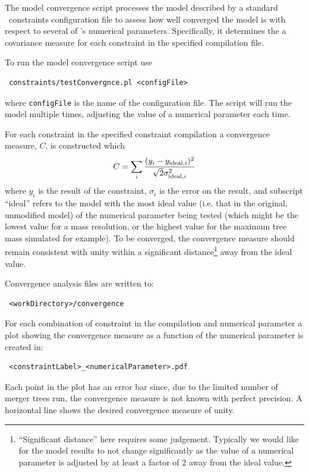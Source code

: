 The model convergence script processes the model described by a standard \glc\ constraints configuration file to assess how well converged the model is with respect to several of \glc's numerical parameters. Specifically, it determines the a covariance measure for each constraint in the specified compilation file.

To run the model convergence script use
\begin{verbatim}
 constraints/testConvergnce.pl <configFile>
\end{verbatim}
where {\tt configFile} is the name of the configuration file. The script will run the model multiple times, adjusting the value of a numerical parameter each time.

For each constraint in the specified constraint compilation a convergence measure, $C$, is constructed which
\begin{equation}
 C = \sum_i {(y_i - y_{{\rm ideal}, i})^2 \over \sqrt{2} \sigma_{{\rm ideal}, i}^2}
\end{equation}
where $y_i$ is the result of the constraint, $\sigma_i$ is the error on the result, and subscript ``ideal'' refers to the model with the most ideal value (i.e. that in the original, unmodified model) of the numerical parameter being tested (which might be the lowest value for a mass resolution, or the highest value for the maximum tree mass simulated for example). To be converged, the convergence measure should remain consistent with unity within a significant distance\footnote{``Significant distance'' here requires some judgement. Typically we would like for the model results to not change significantly as the value of a numerical parameter is adjusted by at least a factor of 2 away from the ideal value.} away from the ideal value.

Convergence analysis files are written to:
\begin{verbatim}
 <workDirectory>/convergence
\end{verbatim}
For each combination of constraint in the compilation and numerical parameter a plot showing the convergence measure as a function of the numerical parameter is created in:
\begin{verbatim}
 <constraintLabel>_<numericalParameter>.pdf
\end{verbatim}
Each point in the plot has an error bar since, due to the limited number of merger trees run, the convergence measure is not known with perfect precision. A horizontal line shows the desired convergence measure of unity.


